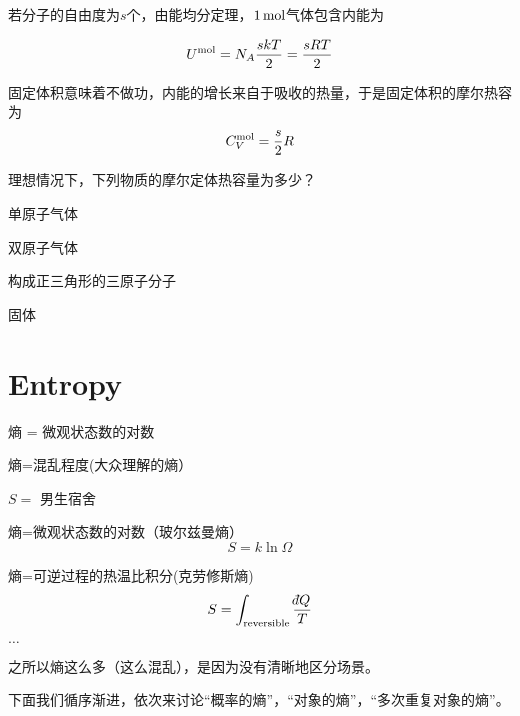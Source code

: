 \documentclass[CJK]{beamer}
\begin{document}
\begin{frame}
\bch
若分子的自由度为$s$个，由能均分定理，$1\,\mathrm{mol}$气体包含内能为

$$U^{\rm mol} = N_A \frac{skT}{2} = \frac{sRT}{2}$$

固定体积意味着不做功，内能的增长来自于吸收的热量，于是固定体积的摩尔热容为
$$C_V^{\rm mol} = \frac{s}{2} R$$
\ech
\end{frame}

\begin{frame}
\bch
理想情况下，下列物质的摩尔定体热容量为多少？

\bitem
\item{单原子气体}
\item{双原子气体}
\item{构成正三角形的三原子分子}
\item{固体}
\eitem
\ech
\end{frame}


\section{Entropy}

\begin{frame}
\bch
{}
\emini
{}
熵 = 微观状态数的对数
\emini
\ech
\end{frame}

\begin{frame}
\bch
\bitem
\item{熵=混乱程度(大众理解的熵）

\begin{center}
$S=$ 男生宿舍
\end{center}
}
\item{熵=微观状态数的对数（玻尔兹曼熵）
$$S = k\ln \Omega$$
}
\item{熵=可逆过程的热温比积分(克劳修斯熵)
$$S = \int_{\rm reversible} \frac{\dbar Q}{T}$$
}
\item{$\ldots$}
\eitem

之所以熵这么多（这么混乱），是因为没有清晰地区分场景。

下面我们循序渐进，依次来讨论“概率的熵”，“对象的熵”，“多次重复对象的熵”。
\ech
\end{frame}
\end{document}
